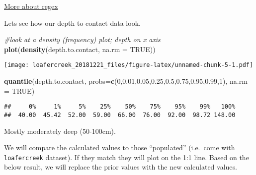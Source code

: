 \documentclass[]{article}
\newenvironment{Shaded}{\begin{snugshade}}{\end{snugshade}}
\newcommand{\KeywordTok}[1]{\textcolor[rgb]{0.13,0.29,0.53}{\textbf{#1}}}
\newcommand{\DataTypeTok}[1]{\textcolor[rgb]{0.13,0.29,0.53}{#1}}
\newcommand{\DecValTok}[1]{\textcolor[rgb]{0.00,0.00,0.81}{#1}}
\newcommand{\FloatTok}[1]{\textcolor[rgb]{0.00,0.00,0.81}{#1}}
\newcommand{\StringTok}[1]{\textcolor[rgb]{0.31,0.60,0.02}{#1}}
\newcommand{\CommentTok}[1]{\textcolor[rgb]{0.56,0.35,0.01}{\textit{#1}}}
\newcommand{\OtherTok}[1]{\textcolor[rgb]{0.56,0.35,0.01}{#1}}
\newcommand{\OperatorTok}[1]{\textcolor[rgb]{0.81,0.36,0.00}{\textbf{#1}}}
\newcommand{\NormalTok}[1]{#1}
\begin{document}
\href{https://www.regular-expressions.info/}{More about regex}

Lets see how our depth to contact data look.

\begin{Shaded}
\begin{Highlighting}[]
\CommentTok{#look at a density (frequency) plot; depth on x axis}
\KeywordTok{plot}\NormalTok{(}\KeywordTok{density}\NormalTok{(depth.to.contact, }\DataTypeTok{na.rm =} \OtherTok{TRUE}\NormalTok{))}
\end{Highlighting}
\end{Shaded}

\texttt{[image: loafercreek\_20181221\_files/figure-latex/unnamed-chunk-5-1.pdf]}

\begin{Shaded}
\begin{Highlighting}[]
\KeywordTok{quantile}\NormalTok{(depth.to.contact, }\DataTypeTok{probs=}\KeywordTok{c}\NormalTok{(}\DecValTok{0}\NormalTok{,}\FloatTok{0.01}\NormalTok{,}\FloatTok{0.05}\NormalTok{,}\FloatTok{0.25}\NormalTok{,}\FloatTok{0.5}\NormalTok{,}\FloatTok{0.75}\NormalTok{,}\FloatTok{0.95}\NormalTok{,}\FloatTok{0.99}\NormalTok{,}\DecValTok{1}\NormalTok{), }\DataTypeTok{na.rm =} \OtherTok{TRUE}\NormalTok{)}
\end{Highlighting}
\end{Shaded}

\begin{verbatim}
##     0%     1%     5%    25%    50%    75%    95%    99%   100% 
##  40.00  45.42  52.00  59.00  66.00  76.00  92.00  98.72 148.00
\end{verbatim}

Mostly moderately deep (50-100cm).

We will compare the calculated values to those ``populated'' (i.e.~come
with \texttt{loafercreek} dataset). If they match they will plot on the
1:1 line. Based on the below result, we will replace the prior values
with the new calculated values.

\begin{Shaded}
\end{Shaded}
\end{document}

